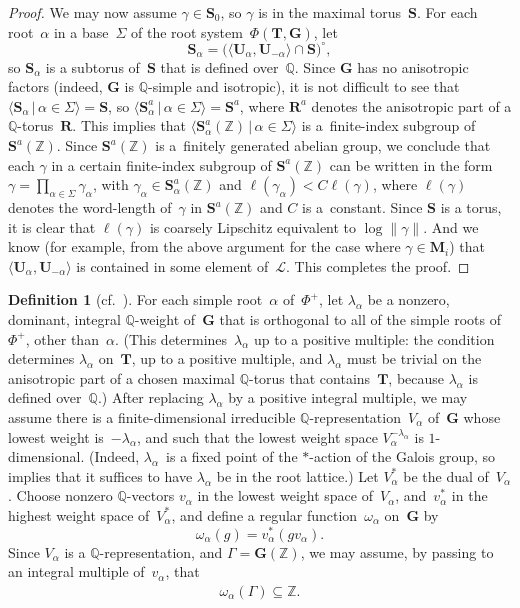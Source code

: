 \documentclass[pdftex]{sigma}
\newcommand{\QQ}{\mathbb{Q}}
\newcommand{\ZZ}{\mathbb{Z}}
\newcommand{\Ga}{\mathbf{G}}
\newcommand{\Ma}{\mathbf{M}}
\newcommand{\Ra}{\mathbf{R}}
\newcommand{\Sa}{\mathbf{S}}
\newcommand{\Ta}{\mathbf{T}}
\newcommand{\Ua}{\mathbf{U}}
\newcommand{\subgroups}{\mathcal{L}}
\numberwithin{equation}{section}
\theoremstyle{definition}
\newtheorem{defn}[thm]{Definition}
\begin{document}
\begin{proof}
We may now assume $\gamma \in \Sa_0$, so $\gamma$ is in the maximal torus~$\Sa$.
For each root~$\alpha$ in a base~$\Sigma$ of the root system~$\Phi(\Ta, \Ga)$, let
	\[\Sa_\alpha = \bigl( \langle \Ua_\alpha, \Ua_{-\alpha} \rangle \cap \Sa \bigr)^\circ , \]
so $\Sa_\alpha$ is a subtorus of~$\Sa$ that is defined over~$\QQ$. Since $\Ga$ has no anisotropic factors (indeed, $\Ga$ is $\QQ$-simple and isotropic), it is not difficult to see that
	$\langle \Sa_\alpha \,|\, \alpha \in \Sigma \rangle = \Sa$,
so
	$\langle \Sa_\alpha^a \,|\, \alpha \in \Sigma \rangle = \Sa^a$,
where $\Ra^a$ denotes the anisotropic part of a $\QQ$-torus~$\Ra$.
This implies that
	$\langle \Sa_\alpha^a(\ZZ) \,|\, \alpha \in \Sigma \rangle$ is a~finite-index subgroup of~$\Sa^a(\ZZ)$.
Since $\Sa^a(\ZZ)$ is a~finitely generated abelian group, we conclude that each $\gamma$ in a certain finite-index subgroup of $\Sa^a(\ZZ)$ can be written in the form
	$\gamma = \prod\limits_{\alpha \in \Sigma} \gamma_\alpha$,
with $\gamma_\alpha \in \Sa_\alpha^a(\ZZ)$ and $\ell(\gamma_\alpha) < C \ell(\gamma)$, where $\ell(\gamma)$ denotes the word-length of~$\gamma$ in $\Sa^a(\ZZ)$ and $C$ is a~constant. Since $\Sa$ is a torus, it is clear that $\ell(\gamma)$ is coarsely Lipschitz equivalent to $\log \|\gamma\|$. And we know (for example, from the above argument for the case where $\gamma \in \Ma_i$) that $\langle \Ua_\alpha, \Ua_{-\alpha} \rangle$ is contained in some element of~$\subgroups$. This completes the proof.
\end{proof}

\begin{defn}[cf.\ {\cite[p.~44]{MR1828742}}] \label{omegaDefn}
For each simple root~$\alpha$ of~$\Phi^+$, let $\lambda_\alpha$ be a nonzero, dominant, integral $\QQ$-weight of~$\Ga$ that is orthogonal to all of the simple roots of~$\Phi^+$, other than~$\alpha$. (This determines~$\lambda_\alpha$ up to a positive multiple: the condition determines $\lambda_\alpha$ on~$\Ta$, up to a positive multiple, and $\lambda_\alpha$ must be trivial on the anisotropic part of a chosen maximal $\QQ$-torus that contains~$\Ta$, because $\lambda_\alpha$ is defined over~$\QQ$.) After replacing $\lambda_\alpha$ by a positive integral multiple, we may assume there is a finite-dimensional irreducible $\QQ$-representation~$V_\alpha$ of~$\Ga$ whose lowest weight is~$-\lambda_\alpha$, and such that the lowest weight space $V_\alpha^{-\lambda_\alpha}$ is $1$-dimensional. (Indeed, $\lambda_\alpha$~is a fixed point of the $*$-action of the Galois group, so \cite[Theorem~3.3]{MR0277536} implies that it suffices to have $\lambda_\alpha$ be in the root lattice.)
Let $V_\alpha^*$ be the dual of~$V_\alpha$. Choose nonzero $\QQ$-vectors $v_\alpha$ in the lowest weight space of~$V_\alpha$, and~$v_\alpha^*$ in the highest weight space of~$V_\alpha^*$, and define a regular function~$\omega_\alpha$ on~$\Ga$ by
	\[ \omega_\alpha(g) = v_\alpha^*( g v_\alpha) .\]
Since $V_\alpha$ is a $\QQ$-representation, and $\Gamma = \Ga(\ZZ)$, we may assume, by passing to an integral multiple of~$v_\alpha$, that
	\begin{gather} \label{omega(Gamma)}
	 \omega_\alpha(\Gamma) \subseteq \ZZ
	. \end{gather}
\end{defn}
\end{document}
